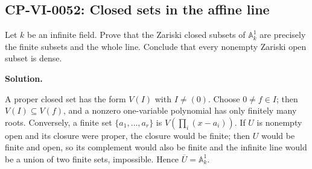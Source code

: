 
\subsection*{CP-VI-0052: Closed sets in the affine line}

Let $k$ be an infinite field. Prove that the Zariski closed subsets of $\mathbb A_k^1$ are precisely the finite subsets and the whole line. Conclude that every nonempty Zariski open subset is dense.

\medskip
\noindent\textbf{Solution.}

A proper closed set has the form $V(I)$ with $I\ne(0)$. Choose $0\ne f\in I$; then $V(I)\subseteq V(f)$, and a nonzero one-variable polynomial has only finitely many roots. Conversely, a finite set $\{a_1,\dots,a_r\}$ is $V(\prod_i(x-a_i))$. If $U$ is nonempty open and its closure were proper, the closure would be finite; then $U$ would be finite and open, so its complement would also be finite and the infinite line would be a union of two finite sets, impossible. Hence $\overline U=\mathbb A_k^1$.
